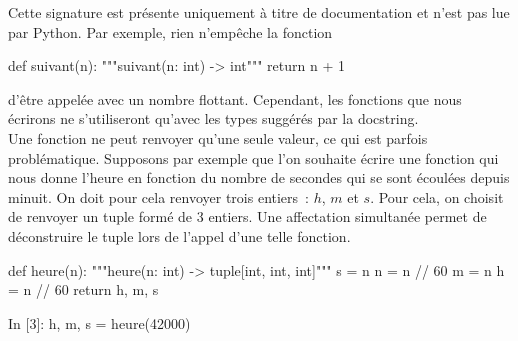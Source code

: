\documentclass{magnolia}
\begin{document}
\noindent
Cette signature est présente uniquement à titre de documentation et
n'est pas lue par Python. Par exemple, rien n'empêche la fonction
\begin{pythoncodeline}
def suivant(n):
    """suivant(n: int) -> int"""
    return n + 1
\end{pythoncodeline}
d'être appelée avec un nombre flottant. Cependant, les fonctions que nous écrirons ne s'utiliseront
qu'avec les types suggérés par la docstring.\\

Une fonction ne peut renvoyer qu'une seule valeur, ce qui est parfois problématique.
Supposons par exemple que l'on souhaite écrire une fonction qui nous donne l'heure en 
fonction du nombre de secondes qui se sont écoulées depuis minuit. On doit pour cela renvoyer
trois entiers~: $h$, $m$ et $s$. Pour cela, on choisit de renvoyer un tuple
formé de 3 entiers. Une affectation simultanée permet de déconstruire le tuple lors de
l'appel d'une telle fonction.

\begin{pythoncodeline}
def heure(n):
    """heure(n: int) -> tuple[int, int, int]"""
    s = n %
    n = n // 60
    m = n %
    h = n // 60
    return h, m, s  
\end{pythoncodeline}

\begin{pythoncode}
In [3]: h, m, s = heure(42000)
\end{pythoncode}

				
\end{document}
